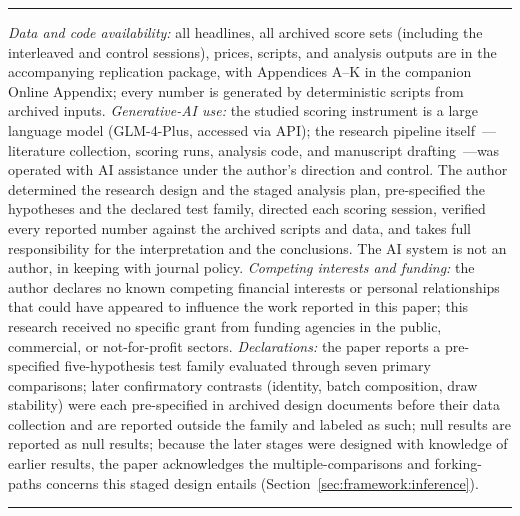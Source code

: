 \vspace{4pt}
\noindent\rule{\textwidth}{0.4pt}
\vspace{2pt}
{\small\noindent\emph{Data and code availability:} all headlines, all archived score sets (including the interleaved and control sessions), prices, scripts, and analysis outputs are in the accompanying replication package, with Appendices A--K in the companion Online Appendix; every number is generated by deterministic scripts from archived inputs. \emph{Generative-AI use:} the studied scoring instrument is a large language model (GLM-4-Plus, accessed via API); the research pipeline itself~---literature collection, scoring runs, analysis code, and manuscript drafting~---was operated with AI assistance under the author's direction and control. The author determined the research design and the staged analysis plan, pre-specified the hypotheses and the declared test family, directed each scoring session, verified every reported number against the archived scripts and data, and takes full responsibility for the interpretation and the conclusions. The AI system is not an author, in keeping with journal policy. \emph{Competing interests and funding:} the author declares no known competing financial interests or personal relationships that could have appeared to influence the work reported in this paper; this research received no specific grant from funding agencies in the public, commercial, or not-for-profit sectors. \emph{Declarations:} the paper reports a pre-specified five-hypothesis test family evaluated through seven primary comparisons; later confirmatory contrasts (identity, batch composition, draw stability) were each pre-specified in archived design documents before their data collection and are reported outside the family and labeled as such; null results are reported as null results; because the later stages were designed with knowledge of earlier results, the paper acknowledges the multiple-comparisons and forking-paths concerns this staged design entails (Section~\ref{sec:framework:inference}).\par}
\vspace{2pt}
\noindent\rule{\textwidth}{0.4pt}
\vspace{6pt}
